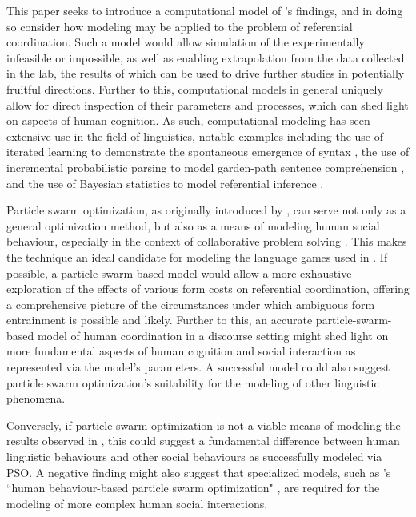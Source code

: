 \documentclass[12pt,a4paper]{article}
\begin{document}
This paper seeks to introduce a computational model of \citeauthor{rohde2012}'s findings, and in doing so consider how modeling may be applied to the problem of referential coordination. Such a model would allow simulation of the experimentally infeasible or impossible, as well as enabling extrapolation from the data collected in the lab, the results of which can be used to drive further studies in potentially fruitful directions. Further to this, computational models in general uniquely allow for direct inspection of their parameters and processes, which can shed light on aspects of human cognition. As such, computational modeling has seen extensive use in the field of linguistics, notable examples including the use of iterated learning to demonstrate the spontaneous emergence of syntax \citep{kirby2002}, the use of incremental probabilistic parsing to model garden-path sentence comprehension \citep{hale2001}, and the use of Bayesian statistics to model referential inference \citep{frank2012}.


Particle swarm optimization, as originally introduced by \citet*{kennedy1995}, can serve not only as a general optimization method, but also as a means of modeling human social behaviour, especially in the context of collaborative problem solving \citep{kennedy1997}. This makes the technique an ideal candidate for modeling the language games used in \citeauthor{rohde2012}. If possible, a particle-swarm-based model would allow a more exhaustive exploration of the effects of various form costs on referential coordination, offering a comprehensive picture of the circumstances under which ambiguous form entrainment is possible and likely. Further to this, an accurate particle-swarm-based model of human coordination in a discourse setting might shed light on more fundamental aspects of human cognition and social interaction as represented via the model's parameters. A successful model could also suggest particle swarm optimization's suitability for the modeling of other linguistic phenomena. 

Conversely, if particle swarm optimization is not a viable means of modeling the results observed in \citeauthor{rohde2012}, this could suggest a fundamental difference between human linguistic behaviours and other social behaviours as successfully modeled via PSO. A negative finding might also suggest that specialized models, such as \citeauthor{liu2014}'s ``human behaviour-based particle swarm optimization" \citeyearpar{liu2014}, are required for the modeling of more complex human social interactions.
\end{document}
